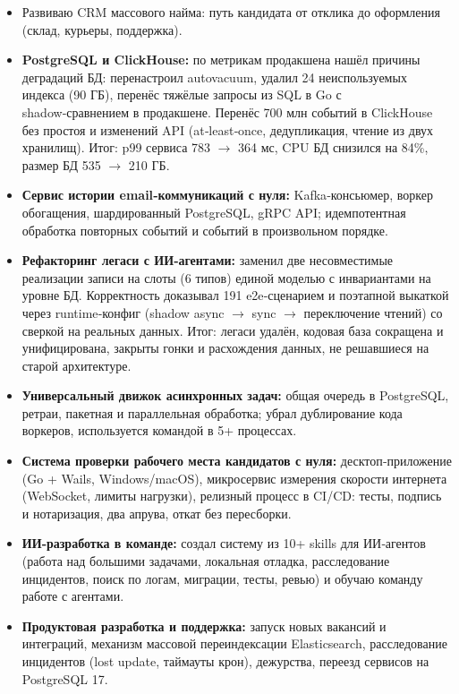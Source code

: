 \documentclass{dodiresume}
\begin{document}
\begin{itemize}
\item Развиваю CRM массового найма: путь кандидата от отклика до оформления (склад, курьеры, поддержка).
\item \textbf{PostgreSQL и ClickHouse:} по метрикам продакшена нашёл причины деградаций БД: перенастроил autovacuum, удалил 24 неиспользуемых индекса (90 ГБ), перенёс тяжёлые запросы из SQL в Go с shadow‑сравнением в продакшене. Перенёс 700 млн событий в ClickHouse без простоя и изменений API (at‑least‑once, дедупликация, чтение из двух хранилищ). Итог: p99 сервиса 783 $\to$ 364 мс, CPU БД снизился на 84\%, размер БД 535 $\to$ 210 ГБ.
\item \textbf{Сервис истории email‑коммуникаций с нуля:} Kafka‑консьюмер, воркер обогащения, шардированный PostgreSQL, gRPC API; идемпотентная обработка повторных событий и событий в произвольном порядке.
\item \textbf{Рефакторинг легаси с ИИ‑агентами:} заменил две несовместимые реализации записи на слоты (6 типов) единой моделью с инвариантами на уровне БД. Корректность доказывал 191 e2e‑сценарием и поэтапной выкаткой через runtime‑конфиг (shadow async $\to$ sync $\to$ переключение чтений) со сверкой на реальных данных. Итог: легаси удалён, кодовая база сокращена и унифицирована, закрыты гонки и расхождения данных, не решавшиеся на старой архитектуре.
\item \textbf{Универсальный движок асинхронных задач:} общая очередь в PostgreSQL, ретраи, пакетная и параллельная обработка; убрал дублирование кода воркеров, используется командой в 5+ процессах.
\item \textbf{Система проверки рабочего места кандидатов с нуля:} десктоп‑приложение (Go + Wails, Windows/macOS), микросервис измерения скорости интернета (WebSocket, лимиты нагрузки), релизный процесс в CI/CD: тесты, подпись и нотаризация, два апрува, откат без пересборки.
\item \textbf{ИИ‑разработка в команде:} создал систему из 10+ skills для ИИ‑агентов (работа над большими задачами, локальная отладка, расследование инцидентов, поиск по логам, миграции, тесты, ревью) и обучаю команду работе с агентами.
\item \textbf{Продуктовая разработка и поддержка:} запуск новых вакансий и интеграций, механизм массовой переиндексации Elasticsearch, расследование инцидентов (lost update, таймауты крон), дежурства, переезд сервисов на PostgreSQL 17.
\end{itemize}
\end{document}
